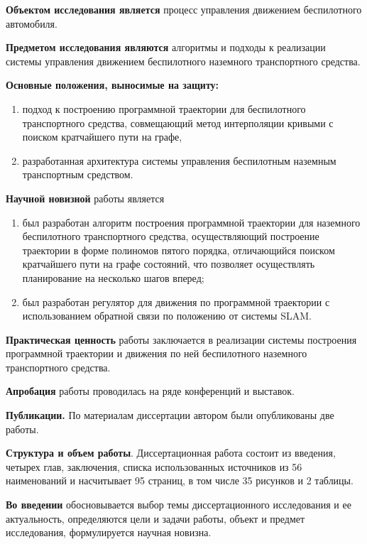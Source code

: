 \textbf{Объектом исследования является} процесс управления движением беспилотного автомобиля.

\textbf{Предметом исследования являются} алгоритмы и подходы к реализации системы управления движением
беспилотного наземного транспортного средства.

\textbf{Основные положения, выносимые на защиту:}
\begin{enumerate}
    \item подход к построению программной траектории для беспилотного транспортного средства, совмещающий метод
          интерполяции кривыми с поиском кратчайшего пути на графе,
    \item разработанная архитектура системы управления беспилотным наземным транспортным средством.
\end{enumerate}

\textbf{Научной новизной} работы является
\begin{enumerate}
    \item был разработан алгоритм построения программной траектории для наземного беспилотного транспортного
          средства, осуществляющий построение траектории в форме полиномов пятого порядка, отличающийся поиском кратчайшего пути на графе состояний, что позволяет осуществлять планирование на несколько
          шагов вперед;
    \item был разработан регулятор для движения по программной траектории с использованием обратной связи по положению
          от системы SLAM.
\end{enumerate}

\textbf{Практическая ценность} работы заключается в реализации системы построения программной
траектории и движения по ней беспилотного наземного транспортного средства.

\textbf{Апробация} работы проводилась на ряде конференций и выставок.

\textbf{Публикации.} По материалам диссертации автором были опубликованы две работы.

\textbf{Структура и объем работы}. Диссертационная работа состоит из введения, четырех глав, заключения,
списка использованных источников из 56 наименований и насчитывает 95 страниц, в том числе 35
рисунков и 2 таблицы.

\textbf{Во введении} обосновывается выбор темы диссертационного исследования и ее актуальность,
определяются цели и задачи работы, объект и предмет исследования, формулируется научная новизна.

